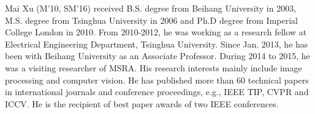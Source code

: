 \documentclass[10pt,journal,compsoc]{IEEEtran}
\begin{document}
\begin{IEEEbiography}{Mai Xu}
(M'10, SM'16) received B.S. degree from Beihang University in 2003, M.S. degree from Tsinghua University in 2006 and Ph.D degree from Imperial College London in 2010. From 2010-2012, he was working as a research fellow at Electrical Engineering Department, Tsinghua University. Since Jan. 2013, he has been with Beihang University as an Associate Professor. During 2014 to 2015, he was a visiting researcher of MSRA. His research interests mainly include image processing and computer vision.  He has published more than 60 technical papers in international journals and conference proceedings, e.g., IEEE TIP, CVPR and ICCV. He is the recipient of best paper awards of two IEEE conferences.
\end{IEEEbiography}

\vspace{-2em}
\end{document}

